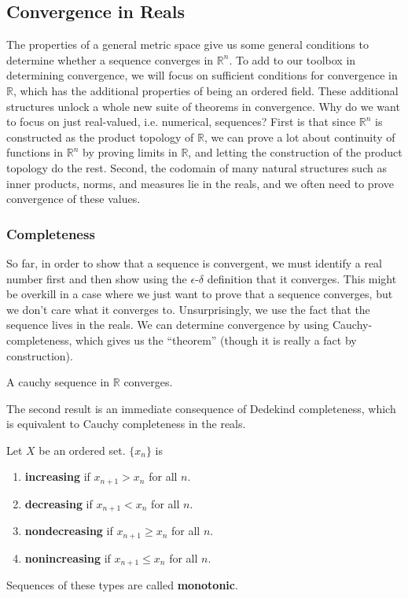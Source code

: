 \subsection{Convergence in Reals}

  The properties of a general metric space give us some general conditions to determine whether a sequence converges in $\mathbb{R}^n$. To add to our toolbox in determining convergence, we will focus on sufficient conditions for convergence in $\mathbb{R}$, which has the additional properties of being an ordered field. These additional structures unlock a whole new suite of theorems in convergence. Why do we want to focus on just real-valued, i.e. numerical, sequences? First is that since $\mathbb{R}^n$ is constructed as the product topology of $\mathbb{R}$, we can prove a lot about continuity of functions in $\mathbb{R}^n$ by proving limits in $\mathbb{R}$, and letting the construction of the product topology do the rest. Second, the codomain of many natural structures such as inner products, norms, and measures lie in the reals, and we often need to prove convergence of these values. 

  \subsubsection{Completeness} 

    So far, in order to show that a sequence is convergent, we must identify a real number first and then show using the $\epsilon$-$\delta$ definition that it converges. This might be overkill in a case where we just want to prove that a sequence converges, but we don't care what it converges to. Unsurprisingly, we use the fact that the sequence lives in the reals. We can determine convergence by using Cauchy-completeness, which gives us the ``theorem'' (though it is really a fact by construction). 

    \begin{theorem}
      A cauchy sequence in $\mathbb{R}$ converges. 
    \end{theorem} 

    The second result is an immediate consequence of Dedekind completeness, which is equivalent to Cauchy completeness in the reals.  

    \begin{definition}
      Let $X$ be an ordered set. $\{x_n\}$ is 
      \begin{enumerate}
        \item \textbf{increasing} if $x_{n+1} > x_n$ for all $n$.
        \item \textbf{decreasing} if $x_{n+1} < x_n$ for all $n$.
        \item \textbf{nondecreasing} if $x_{n+1} \geq x_n$ for all $n$.
        \item \textbf{nonincreasing} if $x_{n+1} \leq x_n$ for all $n$.
      \end{enumerate}
      Sequences of these types are called \textbf{monotonic}. 
    \end{definition}

